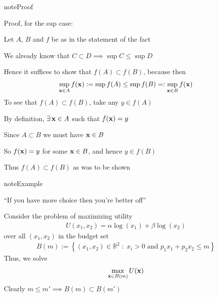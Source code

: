 \documentclass[letterpaper,10pt,english]{jupyterBook}
\begin{document}
\begin{sphinxadmonition}{note}{Proof}

\sphinxAtStartPar
Proof, for the sup case:

\sphinxAtStartPar
Let \(A\), \(B\) and \(f\) be as in the statement of the fact

\sphinxAtStartPar
We already know that \(C \subset D \implies \sup C \leq \sup D\)

\sphinxAtStartPar
Hence it suffices to show that \(f(A) \subset f(B)\), because then
\begin{equation*}
\begin{split}
%
\sup_{{\bf x} \in A} f({\bf x}) 
:= \sup f(A)
\leq \sup f(B) 
=: \sup_{{\bf x} \in B} f({\bf x})
%
\end{split}
\end{equation*}
\sphinxAtStartPar
To see that \(f(A) \subset f(B)\), take any \(y \in f(A)\)

\sphinxAtStartPar
By definition, \(\exists \, {\bf x} \in A\) such that \(f({\bf x}) = y\)

\sphinxAtStartPar
Since \(A \subset B\) we must have \({\bf x} \in B\)

\sphinxAtStartPar
So \(f({\bf x}) = y\) for some \({\bf x} \in B\), and hence \(y \in f(B)\)

\sphinxAtStartPar
Thus \(f(A) \subset f(B)\) as was to be shown
\end{sphinxadmonition}

\begin{sphinxadmonition}{note}{Example}

\sphinxAtStartPar
“If you have more choice then you’re better off”
\end{sphinxadmonition}

\sphinxAtStartPar
Consider the problem of maximizing utility
\begin{equation*}
\begin{split}
%
U(x_1, x_2) = \alpha \log(x_1) + \beta \log(x_2)
%
\end{split}
\end{equation*}
\sphinxAtStartPar
over all \((x_1, x_2)\) in the budget set
\begin{equation*}
\begin{split}
%
B(m) 
:= \left\{ 
(x_1, x_2) \in \mathbb{R}^2
\;:\;
x_i > 0 \text{ and } p_1 x_1 + p_2 x_2 \leq m
\right\}
%
\end{split}
\end{equation*}
\sphinxAtStartPar
Thus, we solve
\begin{equation*}
\begin{split}
%
\max_{{\bf x} \in B(m)} U({\bf x})
%
\end{split}
\end{equation*}
\sphinxAtStartPar
Clearly \(m \leq m' \implies B(m) \subset B(m')\)
\end{document}
